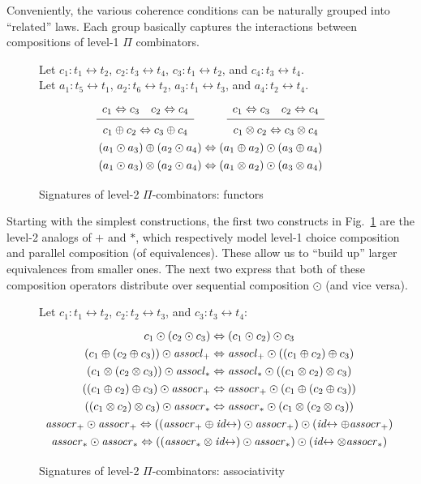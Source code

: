 \documentclass{article}
\newcommand{\assoclp}{\ensuremath{\mathit{assocl}_+}}
\newcommand{\assocrp}{\ensuremath{\mathit{assocr}_+}}
\newcommand{\assoclt}{\ensuremath{\mathit{assocl}_*}}
\newcommand{\assocrt}{\ensuremath{\mathit{assocr}_*}}
\newcommand{\idc}{\mathit{id}\!\!\leftrightarrow}
\newcommand{\Rule}[4]{
\makebox{{\rm #1}
$\displaystyle
\frac{\begin{array}{l}#2 \\\end{array}}
{\begin{array}{l}#3      \\\end{array}}$
 #4}}
\begin{document}
Conveniently, the various coherence conditions can be naturally
grouped into ``related'' laws.  Each group basically captures the
interactions between compositions of level-1 $\Pi$ combinators.

\begin{figure}[t]
Let $c_1 : t_1 \leftrightarrow t_2$, $c_2 : t_3 \leftrightarrow t_4$, $c_3 : t_1 \leftrightarrow t_2$, and $c_4 : t_3 \leftrightarrow t_4$. \\
Let $a_1 : t_5 \leftrightarrow t_1$,  $a_2 : t_6 \leftrightarrow t_2$, $a_3 : t_1 \leftrightarrow t_3$, and $a_4 : t_2 \leftrightarrow t_4$.
\[\def\arraystretch{1.3}
\begin{array}{c}
\Rule{}
  {c_1 \Leftrightarrow c_3 \quad c_2 \Leftrightarrow c_4}
  {c_1 \oplus c_2 \Leftrightarrow c_3 \oplus c_4}
  {}
\qquad
\Rule{}
  {c_1 \Leftrightarrow c_3 \quad c_2 \Leftrightarrow c_4}
  {c_1 \otimes c_2 \Leftrightarrow c_3 \otimes c_4}
  {}
\\
  {(a_1 \odot a_3) \oplus (a_2 \odot a_4) \Leftrightarrow (a_1 \oplus a_2) \odot (a_3 \oplus a_4)}
\\
  {(a_1 \odot a_3) \otimes (a_2 \odot a_4) \Leftrightarrow (a_1 \otimes a_2) \odot (a_3 \otimes a_4)}
\end{array}\]
\caption{\label{fige}Signatures of level-2 $\Pi$-combinators: functors}
\end{figure}

Starting with the simplest constructions, the first two constructs in
Fig.~\ref{fige} are the level-2 analogs of $+$ and $*$, which respectively
model level-1 choice composition and parallel composition (of
equivalences).  These allow us to ``build up'' larger equivalences from smaller
ones.  The next two express that both of these composition operators distribute
over sequential composition $\odot$ (and vice versa).

\begin{figure}[t]
Let $c_1 : t_1 \leftrightarrow t_2$,  $c_2 : t_2 \leftrightarrow t_3$, and $c_3 : t_3 \leftrightarrow t_4$:
\[\def\arraystretch{1.3}
\begin{array}{c}
  {c_1 \odot (c_2 \odot c_3) \Leftrightarrow (c_1 \odot c_2) \odot c_3}
\\
  {(c_1 \oplus (c_2 \oplus c_3)) \odot \assoclp \Leftrightarrow \assoclp \odot ((c_1 \oplus c_2) \oplus c_3)}
\\
  {(c_1 \otimes (c_2 \otimes c_3)) \odot \assoclt \Leftrightarrow \assoclt \odot ((c_1 \otimes c_2) \otimes c_3)}
\\
  {((c_1 \oplus c_2) \oplus c_3) \odot \assocrp \Leftrightarrow \assocrp \odot (c_1 \oplus (c_2 \oplus c_3))}
\\
  {((c_1 \otimes c_2) \otimes c_3) \odot \assocrt \Leftrightarrow \assocrt \odot (c_1 \otimes (c_2 \otimes c_3))}
\\
  {\assocrp \odot \assocrp \Leftrightarrow ((\assocrp \oplus \idc) \odot \assocrp) \odot (\idc \oplus \assocrp)}
\\
  {\assocrt \odot \assocrt \Leftrightarrow ((\assocrt \otimes \idc) \odot \assocrt) \odot (\idc \otimes \assocrt)}
\end{array}\]
\caption{\label{figj}Signatures of level-2 $\Pi$-combinators: associativity}
\end{figure}
\end{document}
